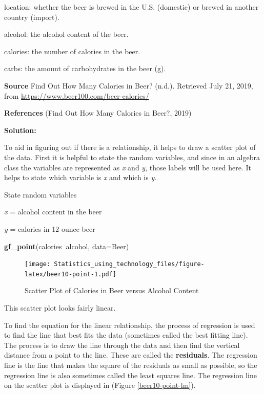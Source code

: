 \documentclass[
]{book}
\newenvironment{Shaded}{\begin{snugshade}}{\end{snugshade}}
\newcommand{\DataTypeTok}[1]{\textcolor[rgb]{0.13,0.29,0.53}{#1}}
\newcommand{\KeywordTok}[1]{\textcolor[rgb]{0.13,0.29,0.53}{\textbf{#1}}}
\newcommand{\NormalTok}[1]{#1}
\newcommand{\OperatorTok}[1]{\textcolor[rgb]{0.81,0.36,0.00}{\textbf{#1}}}
\begin{document}
location: whether the beer is brewed in the U.S. (domestic) or brewed in another country (import).

alcohol: the alcohol content of the beer.

calories: the number of calories in the beer.

carbs: the amount of carbohydrates in the beer (g).

\textbf{Source}
Find Out How Many Calories in Beer? (n.d.). Retrieved July 21, 2019, from \url{https://www.beer100.com/beer-calories/}

\textbf{References}
(Find Out How Many Calories in Beer?, 2019)

\textbf{Solution:}

To aid in figuring out if there is a relationship, it helps to draw a scatter plot of the data. First it is helpful to state the random variables, and since in an algebra class the variables are represented as \emph{x} and \emph{y}, those labels will be used here. It helps to state which variable is \emph{x} and which is \emph{y}.

State random variables

\emph{x} = alcohol content in the beer

\emph{y} = calories in 12 ounce beer



\begin{Shaded}
\begin{Highlighting}[]
\KeywordTok{gf_point}\NormalTok{(calories}\OperatorTok{~}\NormalTok{alcohol, }\DataTypeTok{data=}\NormalTok{Beer)}
\end{Highlighting}
\end{Shaded}

\begin{figure}
\centering
\texttt{[image: Statistics\_using\_technology\_files/figure-latex/beer10-point-1.pdf]}
\caption{\label{fig:beer10-point}Scatter Plot of Calories in Beer versus Alcohol Content}
\end{figure}

This scatter plot looks fairly linear.

To find the equation for the linear relationship, the process of regression is used to find the line that best fits the data (sometimes called the best fitting line). The process is to draw the line through the data and then find the vertical distance from a point to the line. These are called the \textbf{residuals}. The regression line is the line that makes the square of the residuals as small as possible, so the regression line is also sometimes called the least squares line. The regression line on the scatter plot is displayed in (Figure \ref{beer10-point-lm}).
\end{document}
